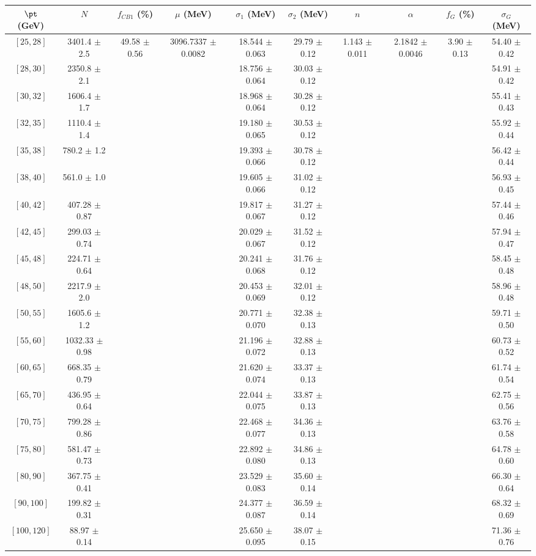 \begin{tabular}{c||c|c|c|c|c|c|c|c|c}
$\pt$ (GeV) & $N$ & $f_{CB1}$ (\%)  & $\mu$ (MeV) & $\sigma_1$ (MeV) & $\sigma_2$ (MeV) & $n$ & $\alpha$ & $f_G$ (\%) & $\sigma_G$ (MeV) \\
\hline
$[25, 28]$ & 3401.4 $\pm$ 2.5 & \multirow{19}{*}{49.58 $\pm$ 0.56} & \multirow{19}{*}{3096.7337 $\pm$ 0.0082} & 18.544 $\pm$ 0.063 & 29.79 $\pm$ 0.12 & \multirow{19}{*}{1.143 $\pm$ 0.011} & \multirow{19}{*}{2.1842 $\pm$ 0.0046} & \multirow{19}{*}{3.90 $\pm$ 0.13} & 54.40 $\pm$ 0.42\\
$[28, 30]$ & 2350.8 $\pm$ 2.1 &  &  & 18.756 $\pm$ 0.064 & 30.03 $\pm$ 0.12 &  &  &  & 54.91 $\pm$ 0.42\\
$[30, 32]$ & 1606.4 $\pm$ 1.7 &  &  & 18.968 $\pm$ 0.064 & 30.28 $\pm$ 0.12 &  &  &  & 55.41 $\pm$ 0.43\\
$[32, 35]$ & 1110.4 $\pm$ 1.4 &  &  & 19.180 $\pm$ 0.065 & 30.53 $\pm$ 0.12 &  &  &  & 55.92 $\pm$ 0.44\\
$[35, 38]$ & 780.2 $\pm$ 1.2 &  &  & 19.393 $\pm$ 0.066 & 30.78 $\pm$ 0.12 &  &  &  & 56.42 $\pm$ 0.44\\
$[38, 40]$ & 561.0 $\pm$ 1.0 &  &  & 19.605 $\pm$ 0.066 & 31.02 $\pm$ 0.12 &  &  &  & 56.93 $\pm$ 0.45\\
$[40, 42]$ & 407.28 $\pm$ 0.87 &  &  & 19.817 $\pm$ 0.067 & 31.27 $\pm$ 0.12 &  &  &  & 57.44 $\pm$ 0.46\\
$[42, 45]$ & 299.03 $\pm$ 0.74 &  &  & 20.029 $\pm$ 0.067 & 31.52 $\pm$ 0.12 &  &  &  & 57.94 $\pm$ 0.47\\
$[45, 48]$ & 224.71 $\pm$ 0.64 &  &  & 20.241 $\pm$ 0.068 & 31.76 $\pm$ 0.12 &  &  &  & 58.45 $\pm$ 0.48\\
$[48, 50]$ & 2217.9 $\pm$ 2.0 &  &  & 20.453 $\pm$ 0.069 & 32.01 $\pm$ 0.12 &  &  &  & 58.96 $\pm$ 0.48\\
$[50, 55]$ & 1605.6 $\pm$ 1.2 &  &  & 20.771 $\pm$ 0.070 & 32.38 $\pm$ 0.13 &  &  &  & 59.71 $\pm$ 0.50\\
$[55, 60]$ & 1032.33 $\pm$ 0.98 &  &  & 21.196 $\pm$ 0.072 & 32.88 $\pm$ 0.13 &  &  &  & 60.73 $\pm$ 0.52\\
$[60, 65]$ & 668.35 $\pm$ 0.79 &  &  & 21.620 $\pm$ 0.074 & 33.37 $\pm$ 0.13 &  &  &  & 61.74 $\pm$ 0.54\\
$[65, 70]$ & 436.95 $\pm$ 0.64 &  &  & 22.044 $\pm$ 0.075 & 33.87 $\pm$ 0.13 &  &  &  & 62.75 $\pm$ 0.56\\
$[70, 75]$ & 799.28 $\pm$ 0.86 &  &  & 22.468 $\pm$ 0.077 & 34.36 $\pm$ 0.13 &  &  &  & 63.76 $\pm$ 0.58\\
$[75, 80]$ & 581.47 $\pm$ 0.73 &  &  & 22.892 $\pm$ 0.080 & 34.86 $\pm$ 0.13 &  &  &  & 64.78 $\pm$ 0.60\\
$[80, 90]$ & 367.75 $\pm$ 0.41 &  &  & 23.529 $\pm$ 0.083 & 35.60 $\pm$ 0.14 &  &  &  & 66.30 $\pm$ 0.64\\
$[90, 100]$ & 199.82 $\pm$ 0.31 &  &  & 24.377 $\pm$ 0.087 & 36.59 $\pm$ 0.14 &  &  &  & 68.32 $\pm$ 0.69\\
$[100, 120]$ & 88.97 $\pm$ 0.14 &  &  & 25.650 $\pm$ 0.095 & 38.07 $\pm$ 0.15 &  &  &  & 71.36 $\pm$ 0.76\\
\end{tabular}
